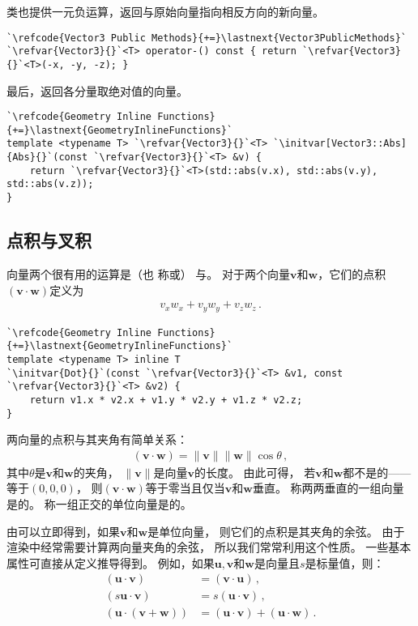 类也提供一元负运算，返回与原始向量指向相反方向的新向量。
\begin{lstlisting}
`\refcode{Vector3 Public Methods}{+=}\lastnext{Vector3PublicMethods}`
`\refvar{Vector3}{}`<T> operator-() const { return `\refvar{Vector3}{}`<T>(-x, -y, -z); }
\end{lstlisting}

最后，返回各分量取绝对值的向量。
\begin{lstlisting}
`\refcode{Geometry Inline Functions}{+=}\lastnext{GeometryInlineFunctions}`
template <typename T> `\refvar{Vector3}{}`<T> `\initvar[Vector3::Abs]{Abs}{}`(const `\refvar{Vector3}{}`<T> &v) {
    return `\refvar{Vector3}{}`<T>(std::abs(v.x), std::abs(v.y), std::abs(v.z));
}
\end{lstlisting}

\subsection{点积与叉积}\label{sub:点积与叉积}
向量两个很有用的运算是（也
称或）
与。
对于两个向量$\bm v$和$\bm w$，它们的点积$(\bm v \cdot \bm w)$定义为
\begin{align*}
    v_x w_x+ v_y w_y+ v_z w_z\, .
\end{align*}
\begin{lstlisting}
`\refcode{Geometry Inline Functions}{+=}\lastnext{GeometryInlineFunctions}`
template <typename T> inline T
`\initvar{Dot}{}`(const `\refvar{Vector3}{}`<T> &v1, const `\refvar{Vector3}{}`<T> &v2) {
    return v1.x * v2.x + v1.y * v2.y + v1.z * v2.z;
}
\end{lstlisting}

两向量的点积与其夹角有简单关系：
\begin{align}\label{eq:2.1}
    (\bm v \cdot \bm w)=\|\bm v\|\|\bm w\|\cos\theta\, ,
\end{align}
其中$\theta$是$\bm v$和$\bm w$的夹角，
$\|\bm v\|$是向量$\bm v$的长度。
由此可得，
若$\bm v$和$\bm w$都不是的——等于$(0,0,0)$，
则$(\bm v \cdot \bm w)$等于零当且仅当$\bm v$和$\bm w$垂直。
称两两垂直的一组向量是的。
称一组正交的单位向量是的。

由可以立即得到，如果$\bm v$和$\bm w$是单位向量，
则它们的点积是其夹角的余弦。
由于渲染中经常需要计算两向量夹角的余弦，
所以我们常常利用这个性质。
一些基本属性可直接从定义推导得到。
例如，如果$\bm u,\bm v$和$\bm w$是向量且$s$是标量值，则：
\begin{align*}
    (\bm u\cdot\bm v)         & =(\bm v\cdot\bm u)\, ,                   \\
    (s\bm u\cdot\bm v)        & =s(\bm u\cdot\bm v)\, ,                  \\
    (\bm u\cdot(\bm v+\bm w)) & =(\bm u\cdot\bm v)+(\bm u\cdot\bm w)\, .
\end{align*}


